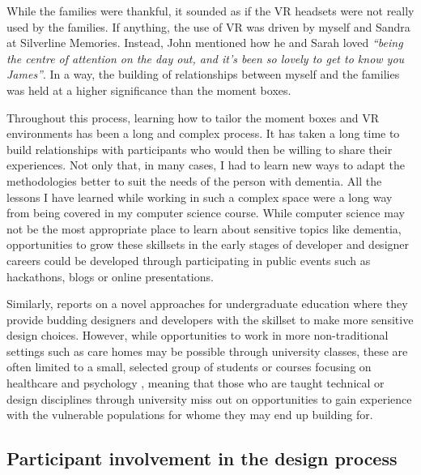 While the families were thankful, it sounded as if the VR headsets were not really used by the families. If anything, the use of VR was driven by myself and Sandra at Silverline Memories. Instead, John mentioned how he and Sarah loved \textit{``being the centre of attention on the day out, and it's been so lovely to get to know you James''}. In a way, the building of relationships between myself and the families was held at a higher significance than the moment boxes.

Throughout this process, learning how to tailor the moment boxes and VR environments has been a long and complex process. It has taken a long time to build relationships with participants who would then be willing to share their experiences. Not only that, in many cases, I had to learn new ways to adapt the methodologies better to suit the needs of the person with dementia. All the lessons I have learned while working in such a complex space were a long way from being covered in my computer science course. While computer science may not be the most appropriate place to learn about sensitive topics like dementia, opportunities to grow these skillsets in the early stages of developer and designer careers could be developed through participating in public events such as hackathons, blogs or online presentations.

Similarly, \cite{hendriks_valuing_2018} reports on a novel approaches for undergraduate education where they provide budding designers and developers with the skillset to make more sensitive design choices. However, while opportunities to work in more non-traditional settings such as care homes may be possible through university classes, these are often limited to a small, selected group of students or courses focusing on healthcare and psychology \citep{kinnunen_understanding_2018}, meaning that those who are taught technical or design disciplines through university miss out on opportunities to gain experience with the vulnerable populations for whome they may end up building for. 

\subsection{Participant involvement in the design process}
\label{extent-co-design}

